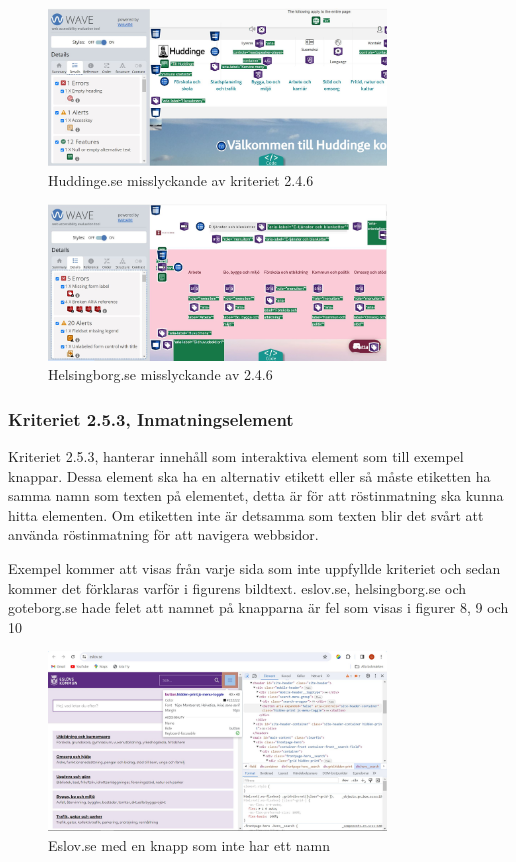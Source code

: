 \documentclass[11p]{article}
\begin{document}
    \begin{figure}[hbt!]
        \includegraphics[width=0.8\textwidth]{../images/Huddinge246.jpg}
        \caption{ Huddinge.se misslyckande av kriteriet 2.4.6 }
    \end{figure}

    \begin{figure}[hbt!]
        \includegraphics[width=0.8\textwidth]{../images/Helsingborg246.jpg}
        \caption{ Helsingborg.se misslyckande av 2.4.6 }
    \end{figure}

    \subsubsection{Kriteriet 2.5.3, Inmatningselement}
    Kriteriet 2.5.3, hanterar innehåll som interaktiva element som till exempel knappar.
    Dessa element ska ha en alternativ etikett eller så måste etiketten ha samma namn som texten på elementet, detta är för att röstinmatning ska kunna hitta elementen.
    Om etiketten inte är detsamma som texten blir det svårt att använda röstinmatning för att navigera webbsidor.

    Exempel kommer att visas från varje sida som inte uppfyllde kriteriet och sedan kommer det förklaras varför i figurens bildtext.
    eslov.se, helsingborg.se och goteborg.se hade felet att namnet på knapparna är fel som visas i figurer 8, 9 och 10

    \begin{figure}[hbt!]
        \includegraphics[width=0.8\textwidth]{../images/Eslov253.jpg}
        \caption{ Eslov.se med en knapp som inte har ett namn }
    \end{figure}
\end{document}

